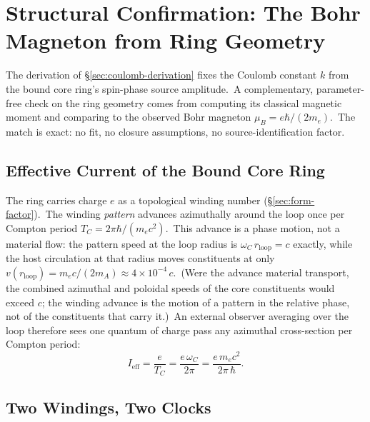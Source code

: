 \documentclass[12pt,letterpaper]{article}
\newcommand{\rloop}{r_{\mathrm{loop}}}
\begin{document}
\section{Structural Confirmation: The Bohr Magneton from Ring Geometry}
\label{sec:bohr-magneton}

The derivation of §\ref{sec:coulomb-derivation} fixes the Coulomb
constant $k$ from the bound core ring's spin-phase source amplitude.\ A
complementary, parameter-free check on the ring geometry comes from
computing its classical magnetic moment and comparing to the observed
Bohr magneton $\mu_B = e\hbar/(2m_e)$.\ The match is exact: no fit, no
closure assumptions, no source-identification factor.

\subsection{Effective Current of the Bound Core Ring}

The ring carries charge $e$ as a topological winding number
(§\ref{sec:form-factor}).\ The winding \emph{pattern} advances
azimuthally around the loop once per Compton period
$T_C = 2\pi\hbar/(m_e c^2)$.\ This advance is a phase motion, not a
material flow: the pattern speed at the loop radius is
$\omega_C\,\rloop = c$ exactly, while the host circulation at that
radius moves constituents at only
$v(\rloop) = m_e c/(2 m_A) \approx 4\times10^{-4}\,c$.\ (Were the
advance material transport, the combined azimuthal and poloidal speeds
of the core constituents would exceed $c$; the winding advance is the
motion of a pattern in the relative phase, not of the constituents that
carry it.)\ An external observer averaging over the loop therefore sees
one quantum of charge pass any azimuthal cross-section per Compton
period:
\begin{equation}
I_{\text{eff}} = \frac{e}{T_C}
              = \frac{e\,\omega_C}{2\pi}
              = \frac{e\,m_e c^2}{2\pi\,\hbar}.
\label{eq:I-eff-bohr}
\end{equation}

\subsection{Two Windings, Two Clocks}
\label{sec:two-clocks}
\end{document}

